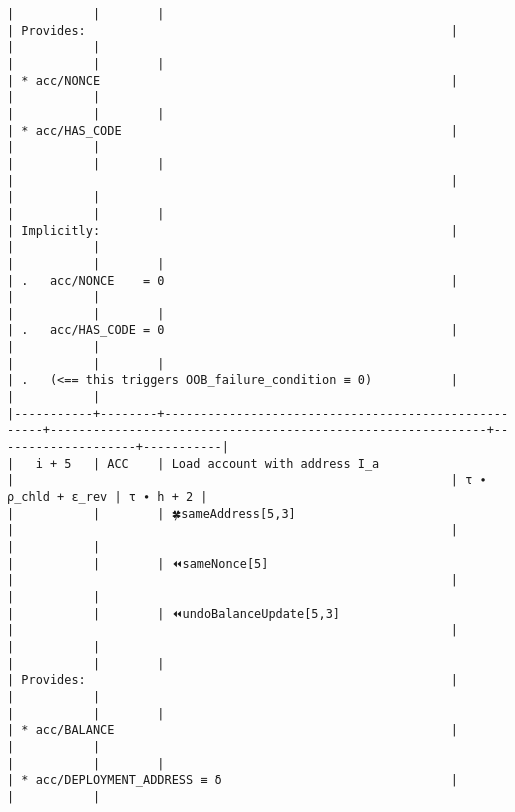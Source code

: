 \documentclass[varwidth=\maxdimen,margin=0.5cm,multi={verbatim}]{standalone}
\begin{document}
\begin{verbatim}
|           |        |                                                     | Provides:                                                   |                    |           |
|           |        |                                                     | * acc/NONCE                                                 |                    |           |
|           |        |                                                     | * acc/HAS_CODE                                              |                    |           |
|           |        |                                                     |                                                             |                    |           |
|           |        |                                                     | Implicitly:                                                 |                    |           |
|           |        |                                                     | .   acc/NONCE    = 0                                        |                    |           |
|           |        |                                                     | .   acc/HAS_CODE = 0                                        |                    |           |
|           |        |                                                     | .   (<== this triggers OOB_failure_condition ≡ 0)           |                    |           |
|-----------+--------+-----------------------------------------------------+-------------------------------------------------------------+--------------------+-----------|
|   i + 5   | ACC    | Load account with address I_a                       |                                                             | τ ∙ ρ_chld + ε_rev | τ ∙ h + 2 |
|           |        | 🍀sameAddress[5,3]                                  |                                                             |                    |           |
|           |        | ⏪sameNonce[5]                                      |                                                             |                    |           |
|           |        | ⏪undoBalanceUpdate[5,3]                            |                                                             |                    |           |
|           |        |                                                     | Provides:                                                   |                    |           |
|           |        |                                                     | * acc/BALANCE                                               |                    |           |
|           |        |                                                     | * acc/DEPLOYMENT_ADDRESS ≡ δ                                |                    |           |

\end{verbatim}
\end{document}
